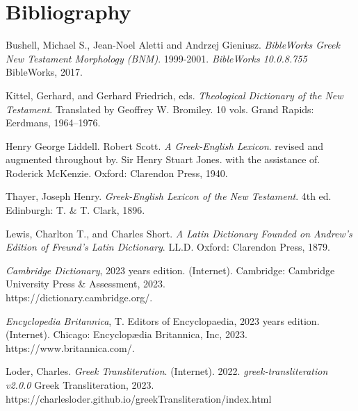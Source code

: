 \documentclass[a4paper,twocolumn,twoside,notitlepage,10pt]{article}
\begin{document}
\section{Bibliography}
\begin{description}
	\item Bushell, Michael S., Jean-Noel Aletti and Andrzej Gieniusz. \emph{BibleWorks Greek New Testament Morphology (BNM)}. 1999-2001. \emph{BibleWorks 10.0.8.755} BibleWorks, 2017.
	\item Kittel, Gerhard, and Gerhard Friedrich, eds. \emph{Theological Dictionary of the New Testament}. Translated by Geoffrey W. Bromiley. 10 vols. Grand Rapids: Eerdmans, 1964--1976.
	\item Henry George Liddell. Robert Scott.  \emph{A Greek-English Lexicon}. revised and augmented throughout by. Sir Henry Stuart Jones. with the assistance of. Roderick McKenzie. Oxford: Clarendon Press, 1940.
	\item Thayer, Joseph Henry. \emph{Greek-English Lexicon of the New Testament}. 4th ed. Edinburgh: T. \& T. Clark, 1896.
	\item Lewis, Charlton T., and Charles Short. \emph{A Latin Dictionary Founded on Andrew's Edition of Freund's Latin Dictionary}. LL.D. Oxford: Clarendon Press, 1879.
	\item \emph{Cambridge Dictionary}, 2023 years edition. (Internet). Cambridge: Cambridge University Press \& Assessment, 2023.\\ https://dictionary.cambridge.org/.
	\item \emph{Encyclopedia Britannica}, T. Editors of Encyclopaedia, 2023 years edition. (Internet). Chicago: Encyclopædia Britannica, Inc, 2023.\\https://www.britannica.com/.
	\item Loder, Charles. \emph{Greek Transliteration}. (Internet). 2022. \emph{greek-transliteration v2.0.0} Greek Transliteration, 2023.\\https://charlesloder.github.io/greekTransliteration/index.html
\end{description}
\end{document}
